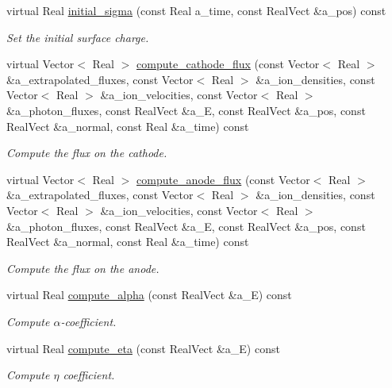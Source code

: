 \begin{DoxyCompactItemize}
virtual Real \hyperlink{classmorrow__lowke_a8561b9a3fb28fc21a3ea0fc69a72c909}{initial\+\_\+sigma} (const Real a\+\_\+time, const Real\+Vect \&a\+\_\+pos) const 
\begin{DoxyCompactList}\small\item\em Set the initial surface charge. \end{DoxyCompactList}\item 
virtual Vector$<$ Real $>$ \hyperlink{classmorrow__lowke_a55c73f9e0180a61f14dc5d801ce27419}{compute\+\_\+cathode\+\_\+flux} (const Vector$<$ Real $>$ \&a\+\_\+extrapolated\+\_\+fluxes, const Vector$<$ Real $>$ \&a\+\_\+ion\+\_\+densities, const Vector$<$ Real $>$ \&a\+\_\+ion\+\_\+velocities, const Vector$<$ Real $>$ \&a\+\_\+photon\+\_\+fluxes, const Real\+Vect \&a\+\_\+E, const Real\+Vect \&a\+\_\+pos, const Real\+Vect \&a\+\_\+normal, const Real \&a\+\_\+time) const 
\begin{DoxyCompactList}\small\item\em Compute the flux on the cathode. \end{DoxyCompactList}\item 
virtual Vector$<$ Real $>$ \hyperlink{classmorrow__lowke_aea9a18503ed23e98f55cfe911f56063f}{compute\+\_\+anode\+\_\+flux} (const Vector$<$ Real $>$ \&a\+\_\+extrapolated\+\_\+fluxes, const Vector$<$ Real $>$ \&a\+\_\+ion\+\_\+densities, const Vector$<$ Real $>$ \&a\+\_\+ion\+\_\+velocities, const Vector$<$ Real $>$ \&a\+\_\+photon\+\_\+fluxes, const Real\+Vect \&a\+\_\+E, const Real\+Vect \&a\+\_\+pos, const Real\+Vect \&a\+\_\+normal, const Real \&a\+\_\+time) const 
\begin{DoxyCompactList}\small\item\em Compute the flux on the anode. \end{DoxyCompactList}\item 
virtual Real \hyperlink{classmorrow__lowke_a7db182e9d45e31fa570ab1fe602f011e}{compute\+\_\+alpha} (const Real\+Vect \&a\+\_\+E) const 
\begin{DoxyCompactList}\small\item\em Compute $\alpha$-\/coefficient. \end{DoxyCompactList}\item 
virtual Real \hyperlink{classmorrow__lowke_a66dc33240ee2ce6d842ae08fd1166423}{compute\+\_\+eta} (const Real\+Vect \&a\+\_\+E) const 
\begin{DoxyCompactList}\small\item\em Compute $\eta$ coefficient. \end{DoxyCompactList}\item 

\end{DoxyCompactItemize}
